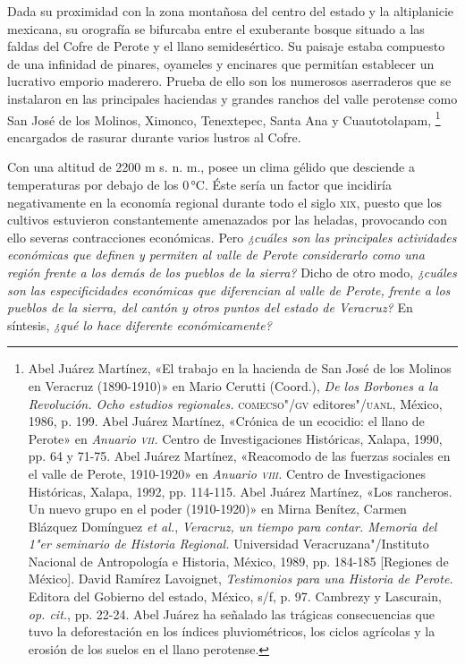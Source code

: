 \documentclass[14pt,twoside,final]{extbook} %
\let\oldfootnote\footnote
\renewcommand\footnote[1]{%
\oldfootnote{\hspace{1mm}#1}}
\begin{document}
Dada su proximidad con la zona montañosa del centro del estado y la altiplanicie mexicana, su orografía se bifurcaba entre el exuberante bosque situado a las faldas del Cofre de Perote y el llano semidesértico. Su paisaje estaba compuesto de una infinidad de pinares, oyameles y encinares que permitían establecer un lucrativo emporio maderero. Prueba de ello son los numerosos aserraderos que se instalaron en las principales haciendas y grandes ranchos del valle perotense como San José de los Molinos, Ximonco, Tenextepec, Santa Ana y Cuautotolapam,\footnote{Abel Juárez Martínez, «El trabajo en la hacienda de San José de los Molinos en Veracruz \mbox{(1890-1910)}» en Mario Cerutti (Coord.), \emph{De los Borbones a la Revolución. Ocho estudios regionales.} \textsc{comecso"/gv} editores"/\textsc{uanl}, México, 1986, p. 199. Abel Juárez Martínez, «Crónica de un ecocidio: el llano de Perote» en \emph{Anuario \textsc{vii}.} Centro de Investigaciones Históricas, Xalapa, 1990, pp. 64 y 71-75. Abel Juárez Martínez, «Reacomodo de las fuerzas sociales en el valle de Perote, 1910-1920» en \emph{Anuario \textsc{viii}.} Centro de Investigaciones Históricas, Xalapa, 1992, pp. 114-115. Abel Juárez Martínez, «Los rancheros. Un nuevo grupo en el poder (1910-1920)» en Mirna Benítez, Carmen Blázquez Domínguez \emph{et al.}, \emph{Veracruz, un tiempo para contar. Memoria del 1"er seminario de Historia Regional.} Universidad Veracruzana"/Instituto Nacional de Antropología e Historia, México, 1989, pp. 184-185 [Regiones de México]. David Ramírez Lavoignet, \emph{Testimonios para una Historia de Perote.} Editora del Gobierno del estado, México, s/f, p. 97. Cambrezy y Lascurain, \emph{op. cit.}, pp. 22-24. Abel Juárez ha señalado las trágicas consecuencias que tuvo la deforestación en los índices pluviométricos, los ciclos agrícolas y la erosión de los suelos en el llano perotense.\index[lugares]{Perote!llano}} encargados de rasurar durante varios lustros al Cofre.

Con una altitud de 2200 m s. n. m., posee un clima gélido que desciende a temperaturas por debajo de los 0\,°C. Éste sería un factor que incidiría negativamente en la economía regional durante todo el siglo \textsc{xix}, puesto que los cultivos estuvieron constantemente amenazados por las heladas, provocando con ello severas contracciones económicas. Pero \emph{¿cuáles son las principales actividades económicas que definen y permiten al valle de Perote considerarlo como una región frente a los demás de los pueblos de la sierra?} Dicho de otro modo, \emph{¿cuáles son las especificidades económicas que diferencian al valle de Perote, frente a los pueblos de la sierra, del cantón y otros puntos del estado de Veracruz?} En síntesis, \emph{¿qué lo hace diferente económicamente?}
\end{document}

